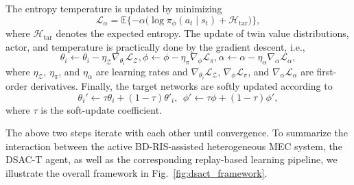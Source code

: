 \documentclass[conference]{IEEEtran}
\begin{document}
The entropy temperature is updated by minimizing 
\begin{equation}
\mathcal{L}_{\alpha}
=
\mathbb{E}
\{
-\alpha\big(\log \pi_\phi(a_t\mid s_t)+\mathcal{H}_{\mathrm{tar}}\big)
\},
\end{equation}
where $\mathcal{H}_\mathrm{tar}$ denotes the expected entropy.
The update of twin value distributions, actor, and temperature is practically done by the gradient descent, i.e.,
\begin{equation}
\theta_i
\leftarrow
\theta_i-\eta_\mathcal{Z}\nabla_{\theta_i}\mathcal{L}_{\mathcal{Z}},
\phi
\leftarrow
\phi-\eta_\pi\nabla_\phi\mathcal{L}_{\pi},
\alpha
\leftarrow
\alpha-\eta_\alpha\nabla_\alpha\mathcal{L}_{\alpha},
\end{equation}
where $\eta_\mathcal{Z}$, $\eta_\pi$, and $\eta_\alpha$ are learning rates and $\nabla_{\theta_i}\mathcal{L}_{\mathcal{Z}}$, $\nabla_{\phi}\mathcal{L}_\pi$, and $\nabla_\alpha\mathcal{L}_\alpha$ are first-order derivatives.  
Finally, the target networks are softly updated according to
\begin{equation}
\theta_i'
\leftarrow
\tau\theta_i+(1-\tau)\theta'_i,~~ \phi'
\leftarrow
\tau\phi+(1-\tau)\phi',
\end{equation}
where $\tau$ is the soft-update coefficient.

The above two steps iterate with each other until convergence. 
To summarize the interaction between the active BD-RIS-assisted heterogeneous MEC system, the DSAC-T agent, as well as the corresponding replay-based learning pipeline, we illustrate the overall framework in Fig.~\ref{fig:dsact_framework}.
\end{document}
